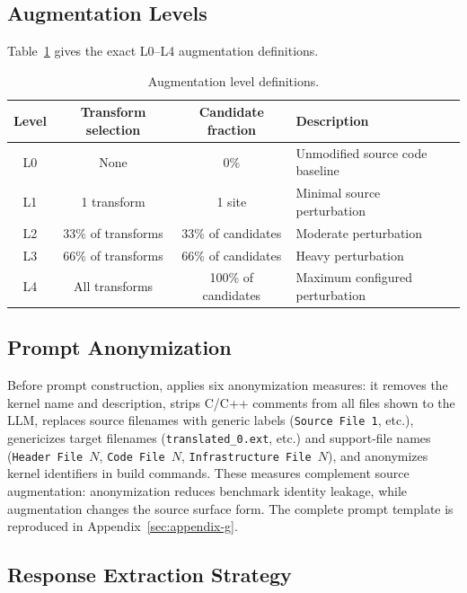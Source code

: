 \subsection{Augmentation Levels}
\label{sec:appendix-a-augmentation}

Table~\ref{tab:augmentation-levels} gives the exact L0--L4 augmentation definitions.

\begin{table}[htbp]
\centering
\caption{Augmentation level definitions.}
\label{tab:augmentation-levels}
\begin{tabular}{@{}cccp{4.2cm}@{}}
\toprule
Level & Transform selection & Candidate fraction & Description \\
\midrule
L0 & None & 0\% & Unmodified source code baseline \\
L1 & 1 transform & 1 site & Minimal source perturbation \\
L2 & 33\% of transforms & 33\% of candidates & Moderate perturbation \\
L3 & 66\% of transforms & 66\% of candidates & Heavy perturbation \\
L4 & All transforms & 100\% of candidates & Maximum configured perturbation \\
\bottomrule
\end{tabular}
\end{table}

\subsection{Prompt Anonymization}
\label{sec:appendix-a-anonymization}

Before prompt construction, \parbench{} applies six anonymization measures: it removes the kernel name and description, strips C/C++ comments from all files shown to the LLM, replaces source filenames with generic labels (\texttt{Source File~1}, etc.), genericizes target filenames (\texttt{translated\_0.ext}, etc.) and support-file names (\texttt{Header File~$N$}, \texttt{Code File~$N$}, \texttt{Infrastructure File~$N$}), and anonymizes kernel identifiers in build commands. These measures complement source augmentation: anonymization reduces benchmark identity leakage, while augmentation changes the source surface form. The complete prompt template is reproduced in Appendix~\ref{sec:appendix-g}.


\subsection{Response Extraction Strategy}
\label{sec:appendix-a-extraction}

